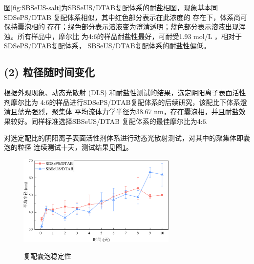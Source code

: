 \documentclass[bachelor,winfonts,replaceperiod]{jnuthesis}
\begin{document}
    图\ref{fig:SBSeUS-salt}为SBSeUS/DTAB复配体系的耐盐相图，现象基本同SDSePS/DTAB
    复配体系相似，其中红色部分表示在此浓度的 存在下，体系尚可保持囊泡相的
    存在；绿色部分表示溶液变为澄清透明；蓝色部分表示溶液出现浑浊。所有样品中，摩尔比
    为4:6的样品耐盐性最好，可耐受1.93 mol/L ，相对于SDSePS/DTAB复配体系，
    SBSeUS/DTAB复配体系的耐盐性偏低。
    
    \subsection*{(2) 粒径随时间变化}
    根据外观现象、动态光散射 (DLS) 和耐盐性测试的结果，选定阴阳离子表面活性剂摩尔比为
    4:6的样品进行SDSePS/DTAB复配体系的后续研究，该配比下体系澄清且蓝光强烈，聚集体
    平均流体力学半径为38.67 nm，存在囊泡相，并且耐盐效果较好。同样标准选择SBSeUS/DTAB
    复配体系的最佳摩尔比为4:6.
    
    对选定配比的阴阳离子表面活性剂体系进行动态光散射测试，对其中的聚集体即囊泡的粒径
    连续测试十天，测试结果见图\ref{fig:vesicle-time-stability}。
    \begin{figure}[htbp]
        \centering
        \includegraphics[width=0.7\textwidth]{figure/vesicle-time-stability.pdf}\\
        \caption{复配囊泡稳定性}\label{fig:vesicle-time-stability}
    \end{figure}
\end{document}
